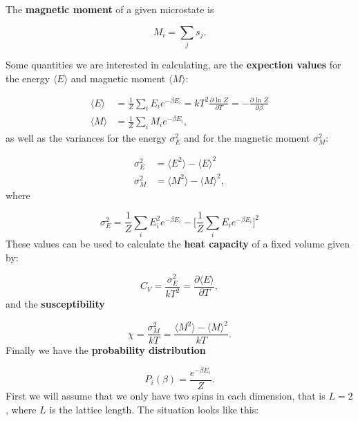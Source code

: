 \documentclass{article}
\begin{document}
\begin{multicols}{2}
The \textbf{magnetic moment} of a given microstate is

\begin{equation}\label{eq:magnetization}
	M_i = \sum_j s_j.
\end{equation} 

Some quantities we are interested in calculating, are the \textbf{expection values} for the energy $\langle E\rangle$ and magnetic moment $\langle M\rangle$:

\begin{equation}
\begin{aligned}
	\langle E \rangle &= \frac{1}{Z} \sum_i E_i e^{- \beta E_i} = kT^2 \frac{\partial \textrm{ ln } Z}{\partial T} = - \frac{\partial \textrm{ ln } Z}{\partial \beta} \\
	\langle M\rangle &= \frac{1}{Z} \sum_i M_i e^{- \beta E_i},
\end{aligned}
\end{equation}
as well as the variances for the energy $\sigma_E^2$ and for the magnetic moment $\sigma_M^2$:

\begin{equation}\label{eq:expect_values}
\begin{aligned}
	\sigma_E^2 &= \langle E^2\rangle - \langle E\rangle^2 \\
	\sigma_M^2 &= \langle M^2\rangle - \langle M\rangle^2,
\end{aligned}
\end{equation}
where

\begin{equation}
	\sigma_E^2 = \frac{1}{Z} \sum_i E_i^2 e^{- \beta E_i} - \bigg[ \frac{1}{Z} \sum_i E_i e^{- \beta E_i} \bigg]^2
\end{equation}
These values can be used to calculate the \textbf{heat capacity} of a fixed volume given by:

\begin{equation}
	C_V = \frac{\sigma_E^2}{kT^2} = \frac{\partial \langle E\rangle}{\partial T},
\end{equation}
and the \textbf{susceptibility}

\begin{equation}
	\chi = \frac{\sigma_M^2}{kT} = \frac{\langle M^2\rangle - \langle M\rangle^2}{kT}.
\end{equation}
Finally we have the \textbf{probability distribution}

\begin{equation}
	P_i (\beta) = \frac{e^{-\beta E_i}}{Z}.
\end{equation}
First we will assume that we only have two spins in each dimension, that is $L = 2$, where $L$ is the lattice length. The situation looks like this:


\end{multicols}
\end{document}
